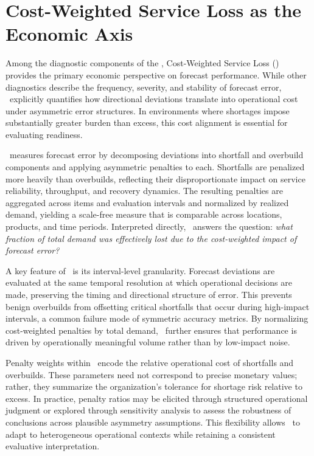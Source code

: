 \section{Cost-Weighted Service Loss as the Economic Axis}

Among the diagnostic components of the \FRF, Cost-Weighted Service Loss (\CWSL) provides
the primary economic perspective on forecast performance. While other diagnostics describe
the frequency, severity, and stability of forecast error, \CWSL\ explicitly quantifies how
directional deviations translate into operational cost under asymmetric error structures. In
environments where shortages impose substantially greater burden than excess, this cost
alignment is essential for evaluating readiness.

\CWSL\ measures forecast error by decomposing deviations into shortfall and overbuild
components and applying asymmetric penalties to each. Shortfalls are penalized more heavily
than overbuilds, reflecting their disproportionate impact on service reliability, throughput,
and recovery dynamics. The resulting penalties are aggregated across items and evaluation
intervals and normalized by realized demand, yielding a scale-free measure that is comparable
across locations, products, and time periods. Interpreted directly, \CWSL\ answers the
question: \emph{what fraction of total demand was effectively lost due to the cost-weighted
impact of forecast error?}

A key feature of \CWSL\ is its interval-level granularity. Forecast deviations are evaluated at
the same temporal resolution at which operational decisions are made, preserving the timing
and directional structure of error. This prevents benign overbuilds from offsetting critical
shortfalls that occur during high-impact intervals, a common failure mode of symmetric
accuracy metrics. By normalizing cost-weighted penalties by total demand, \CWSL\ further
ensures that performance is driven by operationally meaningful volume rather than by
low-impact noise.

Penalty weights within \CWSL\ encode the relative operational cost of shortfalls and
overbuilds. These parameters need not correspond to precise monetary values; rather, they
summarize the organization’s tolerance for shortage risk relative to excess. In practice,
penalty ratios may be elicited through structured operational judgment or explored through
sensitivity analysis to assess the robustness of conclusions across plausible asymmetry
assumptions. This flexibility allows \CWSL\ to adapt to heterogeneous operational contexts
while retaining a consistent evaluative interpretation.

